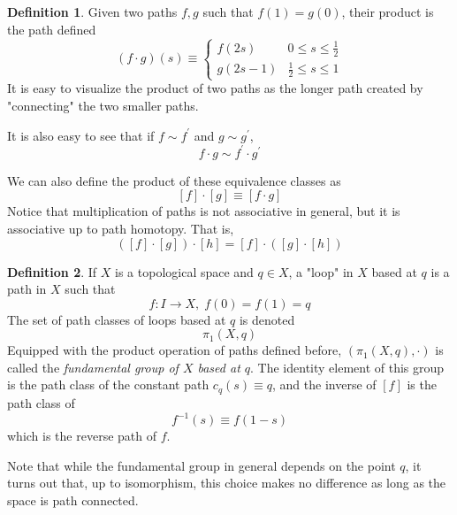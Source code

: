 \documentclass{article}
\theoremstyle{remark}
\theoremstyle{definition}
\newtheorem{definition}{Definition}[section]
\begin{document}
  \begin{definition}
  Given two paths $f, g$ such that $f(1) = g(0)$, their product is the path defined
  \[(f \cdot g) (s) \equiv \begin{cases}
        f(2s) & 0 \leq s \leq \frac{1}{2} \\
        g(2s - 1) & \frac{1}{2} \leq s \leq 1
  \end{cases}\]
  It is easy to visualize the product of two paths as the longer path created by "connecting" the two smaller paths. 
  \begin{center}
  \end{center}
  It is also easy to see that if $f \sim f^\prime$ and $g \sim g^\prime$, 
  \[f \cdot g \sim f^\prime \cdot g^\prime\]
  \end{definition}

  We can also define the product of these equivalence classes as
  \[[f] \cdot [g] \equiv [f \cdot g]\]
  Notice that multiplication of paths is not associative in general, but it is associative up to path homotopy. That is, 
  \[([f] \cdot [g]) \cdot [h] = [f] \cdot ([g] \cdot [h])\]

  \begin{definition}
  If $X$ is a topological space and $q \in X$, a "loop" in $X$ based at $q$ is a path in $X$ such that
  \[f: I\longrightarrow X, \; f(0) = f(1) = q\]
  The set of path classes of loops based at $q$ is denoted
  \[\pi_1 (X, q)\]
  Equipped with the product operation of paths defined before, $(\pi_1 (X, q), \cdot)$ is called the \textit{fundamental group of $X$ based at $q$}. The identity element of this group is the path class of the constant path $c_q(s) \equiv q$, and the inverse of $[f]$ is the path class of 
  \[f^{-1} (s) \equiv f(1-s)\]
  which is the reverse path of $f$. 
  \end{definition}

  Note that while the fundamental group in general depends on the point $q$, it turns out that, up to isomorphism, this choice makes no difference as long as the space is path connected. 
\end{document}
